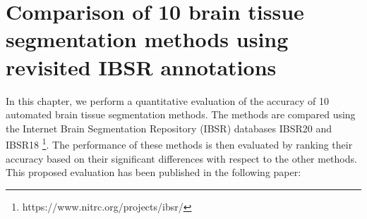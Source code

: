 
\chapter{Comparison of 10 brain tissue segmentation methods using revisited IBSR annotations}  
\label{chapter:chapter_2}

In this chapter, we perform a quantitative evaluation of the accuracy of 10 automated brain tissue segmentation methods. The methods are compared using the Internet Brain Segmentation Repository (IBSR) databases IBSR20 and IBSR18 \footnote{https://www.nitrc.org/projects/ibsr/}. The performance of these methods is then evaluated by ranking their accuracy based on their significant differences with respect to the other methods. This proposed evaluation has been published in the following paper:

\vspace{2cm}

\noindent{}






